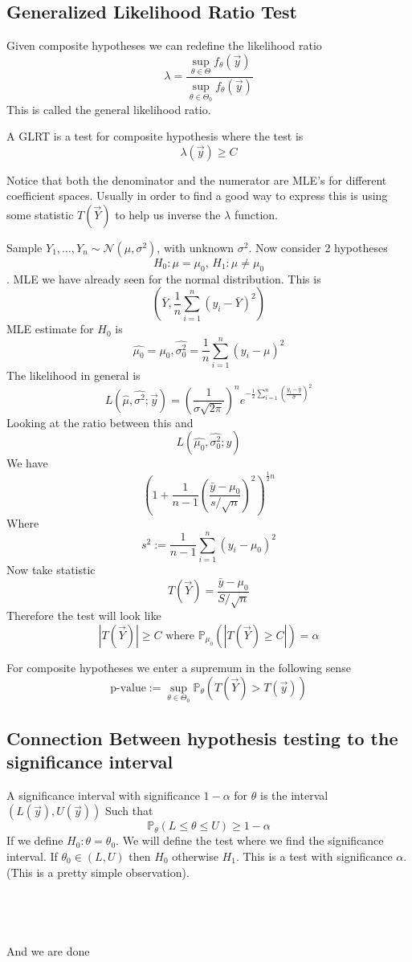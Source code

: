 \documentclass[../main.tex]{subfiles}
\begin{document}
\subsection{Generalized Likelihood Ratio Test}
Given composite hypotheses we can redefine the likelihood ratio
\[\lambda=\frac{\sup_{\theta\in\Theta} f_{\theta}(\overrightarrow{y})}{\sup_{\theta\in\Theta_0} f_{\theta}(\overrightarrow{y})}\]
This is called the general likelihood ratio. 
\begin{definition}
A GLRT is a test for composite hypothesis where the test is
\[\lambda(\overrightarrow{y})\geq C\]
\end{definition}
Notice that both the denominator and the numerator are MLE's for different coefficient spaces. Usually in order to find a good way to express this is using some statistic $T(\overrightarrow{Y})$ to help us inverse the $\lambda$ function. 
\begin{example}
Sample $Y_1,\dots,Y_n\sim\mathcal{N}(\mu,\sigma^2)$, with unknown $\sigma^2$. Now consider 2 hypotheses
\[H_0:\mu=\mu_0\text{, } H_1:\mu\neq\mu_0\]. 
MLE we have already seen for the normal distribution. This is
\[\left(\bar{Y}, \frac{1}{n}\sum_{i=1}^n \left(y_i - \bar{Y}\right)^2\right)\]
MLE estimate for $H_0$ is 
\[\hat{\mu_0}=\mu_0, \hat{\sigma^2_0} = \frac{1}{n}\sum_{i=1}^n \left(y_i-\mu\right)^2\]
The likelihood in general is 
\[L(\hat{\mu},\hat{\sigma^2}; \overrightarrow{y})=\left(\frac{1}{\sigma\sqrt{2\pi}}\right)^ne^{-\frac{1}{2} \sum_{i=1}^n (\frac{y_i-\bar{y}}{\hat{\sigma}})^2}\]
Looking at the ratio between this and \[L(\hat{\mu_0},\hat{\sigma_0^2}; y)\]
We have 
\[\left(1+\frac{1}{n-1}\left(\frac{\bar{y}-\mu_0}{s/\sqrt{n}}\right)^2\right)^{\frac{1}{2} n}\]
Where \[s^2:= \frac{1}{n-1}\sum_{i=1}^n (y_i-\mu_0)^2\]
Now take statistic
\[T(\overrightarrow{Y}) = \frac{\bar{y}-\mu_0}{S/\sqrt{n}}\]
Therefore the test will look like
\[|T(\overrightarrow{Y})|\geq C \text{ where } \mathbb{P}_{\mu_0}(|T(\overrightarrow{Y})\geq C|) = \alpha\]
\end{example}
For composite hypotheses we enter a supremum in the following sense
\[\text{p-value}:=\sup_{\theta\in\Theta_0}\mathbb{P}_{\theta}\left(T(\overrightarrow{Y})>T(\overrightarrow{y})\right)\]
\subsection{Connection Between hypothesis testing to the significance interval}
A significance interval with significance $1-\alpha$ for $\theta$ is the interval $\left(L(\overrightarrow{y}), U(\overrightarrow{y})\right)$
Such that 
\[\mathbb{P}_{\theta}(L\leq\theta\leq U)\geq1-\alpha\]
If we define $H_0:\theta=\theta_0$. We will define the test where we find the significance interval. If $\theta_0\in(L,U)$ then $H_0$ otherwise $H_1$. This is a test with significance $\alpha$. (This is a pretty simple observation).
\\\\\\\\\\
And we are done
\end{document}
